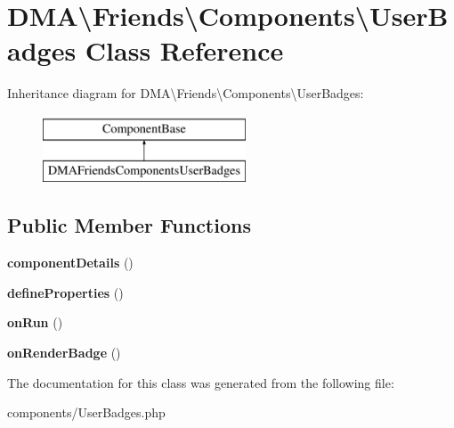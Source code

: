 \hypertarget{classDMA_1_1Friends_1_1Components_1_1UserBadges}{\section{D\+M\+A\textbackslash{}Friends\textbackslash{}Components\textbackslash{}User\+Badges Class Reference}
\label{classDMA_1_1Friends_1_1Components_1_1UserBadges}
}
Inheritance diagram for D\+M\+A\textbackslash{}Friends\textbackslash{}Components\textbackslash{}User\+Badges\+:\begin{figure}[H]
\begin{center}
\leavevmode
\includegraphics[height=2.000000cm]{d8/d01/classDMA_1_1Friends_1_1Components_1_1UserBadges}
\end{center}
\end{figure}
\subsection*{Public Member Functions}
\begin{DoxyCompactItemize}
\item 
\hypertarget{classDMA_1_1Friends_1_1Components_1_1UserBadges_a6e3e13d8f4a57f8845f2c6371c8dbd58}{{\bfseries component\+Details} ()}\label{classDMA_1_1Friends_1_1Components_1_1UserBadges_a6e3e13d8f4a57f8845f2c6371c8dbd58}

\item 
\hypertarget{classDMA_1_1Friends_1_1Components_1_1UserBadges_aae166c2a0b03d1048472286433f21970}{{\bfseries define\+Properties} ()}\label{classDMA_1_1Friends_1_1Components_1_1UserBadges_aae166c2a0b03d1048472286433f21970}

\item 
\hypertarget{classDMA_1_1Friends_1_1Components_1_1UserBadges_acec1de754996d056cdc99efa976826b9}{{\bfseries on\+Run} ()}\label{classDMA_1_1Friends_1_1Components_1_1UserBadges_acec1de754996d056cdc99efa976826b9}

\item 
\hypertarget{classDMA_1_1Friends_1_1Components_1_1UserBadges_a2e7b3d79df774a45d2c433a606a2020b}{{\bfseries on\+Render\+Badge} ()}\label{classDMA_1_1Friends_1_1Components_1_1UserBadges_a2e7b3d79df774a45d2c433a606a2020b}

\end{DoxyCompactItemize}


The documentation for this class was generated from the following file\+:\begin{DoxyCompactItemize}
\item 
components/User\+Badges.\+php\end{DoxyCompactItemize}
